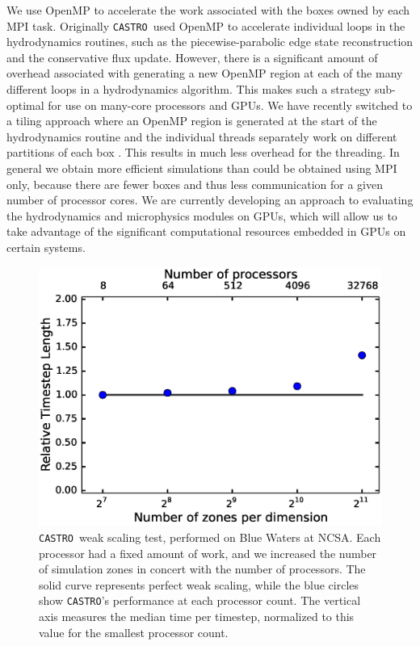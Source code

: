 \documentclass[iop,numberedappendix]{../emulateapj}
\newcommand{\castro}{\texttt{CASTRO}}
\begin{document}
We use OpenMP to accelerate the work associated with the boxes owned
by each MPI task. Originally \castro\ used OpenMP to accelerate
individual loops in the hydrodynamics routines, such as the
piecewise-parabolic edge state reconstruction and the conservative
flux update. However, there is a significant amount of overhead
associated with generating a new OpenMP region at each of the many
different loops in a hydrodynamics algorithm. This makes such a
strategy sub-optimal for use on many-core processors and GPUs. We have
recently switched to a tiling approach where an OpenMP region is
generated at the start of the hydrodynamics routine and the individual
threads separately work on different partitions of each box \citep{boxlib-tiling}. This
results in much less overhead for the threading. In general we obtain
more efficient simulations than could be obtained using MPI only,
because there are fewer boxes and thus less communication for a given
number of processor cores. We are currently developing an approach to
evaluating the hydrodynamics and microphysics modules on GPUs,
which will allow us to
take advantage of the significant computational resources embedded in
GPUs on certain systems.

\begin{figure}
  \centering
  \includegraphics[scale=0.4]{plots/weak_scaling}
  \caption{\castro\ weak scaling test, performed on Blue Waters at 
    NCSA. Each processor had a fixed amount of work, and we increased the 
    number of simulation zones in concert with the number of processors. The 
    solid curve represents perfect weak scaling, while the blue circles show 
    \castro's performance at each processor count. The vertical axis measures 
    the median time per timestep, normalized to this value for the smallest 
    processor count.\label{fig:weak_scaling}}
\end{figure}
\end{document}
